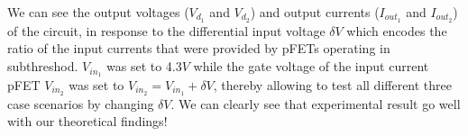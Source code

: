 We can see the output voltages ($V_{d_1}$ and $V_{d_2}$) and output currents ($I_{out_1}$ and $I_{out_2}$) of the circuit, in response to the differential input voltage $\delta V$ which encodes the ratio of the input currents that were provided by pFETs operating in subthreshod. $V_{in_1}$ was set to 4.3$V$ while the gate voltage of the input current pFET $V_{in_2}$ was set to $V_{in_2} = V_{in_1} + \delta V$, thereby allowing to test all different three case scenarios by changing $\delta V$. We can clearly see that experimental result go well with our theoretical findings!

















